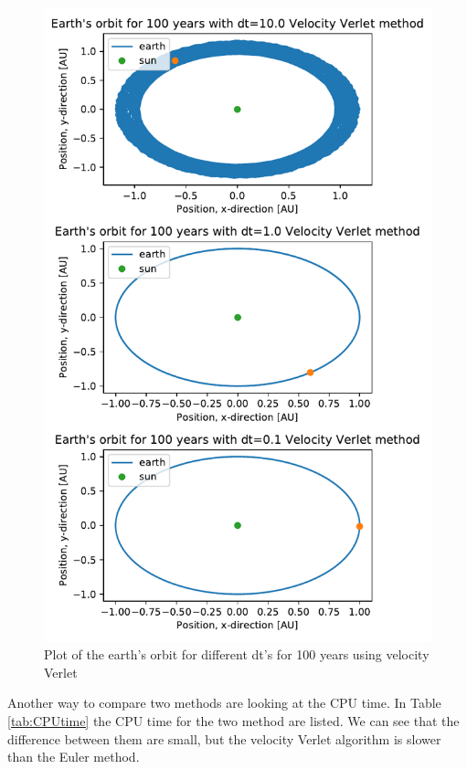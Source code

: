 \begin{figure}[H]
	\includegraphics[width=1\linewidth]{../results/plots/different_timesteps_Velocity_Verlet_method.pdf}\caption{Plot of the earth's orbit for different dt's for 100 years using velocity Verlet }\label{fig:timesteps-verlet}
\end{figure}		

Another way to compare two methods are looking at the CPU time. In Table \ref{tab:CPUtime} the CPU time for the two method are listed. We can see that the difference between them are small, but the velocity Verlet algorithm is slower than the Euler method. 


